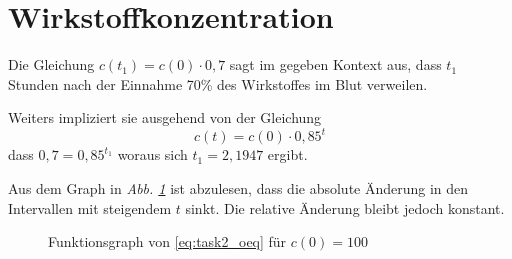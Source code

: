 \documentclass[a4paper]{article}
\newcommand{\figref}[1]{\emph{Abb. \ref{#1}}}
\begin{document}
\section{Wirkstoffkonzentration}

\begin{tasks}
    \item Die Gleichung $c(t_1) = c(0) \cdot 0,7$ sagt im gegeben Kontext aus, dass $t_1$ Stunden nach der Einnahme 70\% des Wirkstoffes im Blut verweilen.

    Weiters impliziert sie ausgehend von der Gleichung
    \begin{equation}\label{eq:task2_oeq}
        c(t) = c(0) \cdot 0,85^t
    \end{equation}
    dass $0,7 = 0,85^{t_1}$ woraus sich $t_1 = 2,1947$ ergibt.

    \item Aus dem Graph in \figref{fig:task2_f} ist abzulesen, dass die absolute Änderung in den Intervallen mit steigendem $t$ sinkt. Die relative Änderung bleibt jedoch konstant.

    \begin{figure}[!h]
        \centering
        \caption{Funktionsgraph von \eqref{eq:task2_oeq} für $c(0) = 100$}
        \label{fig:task2_f}
    \end{figure}
\end{tasks}
\end{document}
